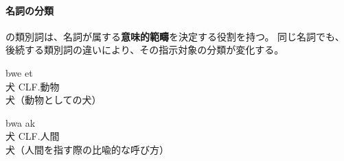 \paragraph{名詞の分類}

\langname の類別詞は、名詞が属する\textbf{意味的範疇}を決定する役割を持つ。
同じ名詞でも、後続する類別詞の違いにより、その指示対象の分類が変化する。
\begin{exe}
\ex \gll bwe et\\
犬 CLF.動物\\
\glt 犬（動物としての犬）
\end{exe}
\begin{exe}
\ex \gll bwa ak\\
犬 CLF.人間\\
\glt 犬（人間を指す際の比喩的な呼び方）
\end{exe}